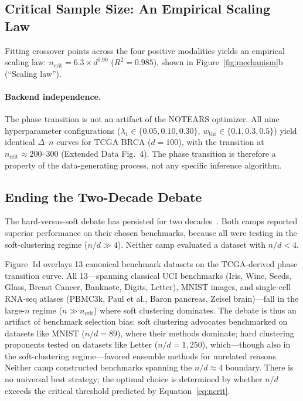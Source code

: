 \documentclass[12pt,a4paper]{article}
\begin{document}
\subsection{Critical Sample Size: An Empirical Scaling Law}

Fitting crossover points across the four positive modalities yields an empirical scaling law: $n_{\text{crit}} = 6.3 \times d^{0.90}$ ($R^2 = 0.985$), shown in Figure~\ref{fig:mechanism}b (``Scaling law'').

\paragraph{Backend independence.}
The phase transition is not an artifact of the NOTEARS optimizer.
All nine hyperparameter configurations ($\lambda_1 \in \{0.05, 0.10, 0.30\}$,
$w_{\mathrm{thr}} \in \{0.1, 0.3, 0.5\}$) yield identical $\Delta$--$n$ curves for TCGA BRCA ($d=100$), with the transition at $n_{\mathrm{crit}} \approx 200$--$300$ (Extended Data Fig.~4). The phase transition is therefore a property of the data-generating process, not any specific inference algorithm.

\subsection{Ending the Two-Decade Debate}

The hard-versus-soft debate has persisted for two decades~\cite{jain2010data}. Both camps reported superior performance on their chosen benchmarks, because all were testing in the soft-clustering regime ($n/d \gg 4$). Neither camp evaluated a dataset with $n/d < 4$.

Figure~1d overlays 13 canonical benchmark datasets on the TCGA-derived phase transition curve. All 13---spanning classical UCI benchmarks (Iris, Wine, Seeds, Glass, Breast Cancer, Banknote, Digits, Letter), MNIST images, and single-cell RNA-seq atlases (PBMC3k, Paul et al., Baron pancreas, Zeisel brain)---fall in the large-$n$ regime ($n \gg n_{\text{crit}}$) where soft clustering dominates. The debate is thus an artifact of benchmark selection bias: soft clustering advocates benchmarked on datasets like MNIST ($n/d = 89$), where their methods dominate; hard clustering proponents tested on datasets like Letter ($n/d = 1{,}250$), which---though also in the soft-clustering regime---favored ensemble methods for unrelated reasons. Neither camp constructed benchmarks spanning the $n/d \approx 4$ boundary. There is no universal best strategy; the optimal choice is determined by whether $n/d$ exceeds the critical threshold predicted by Equation~\ref{eq:ncrit}.
\end{document}
